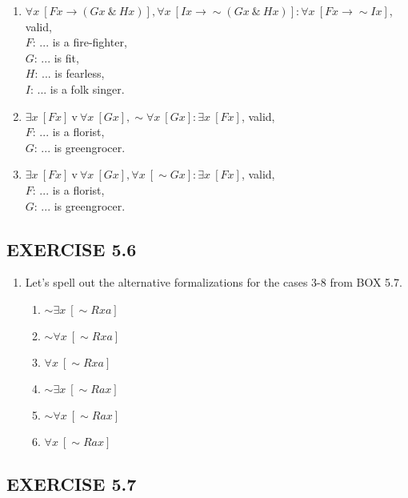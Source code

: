 \documentclass[a4paper,12pt]{article}
\newcommand{\ra}{\rightarrow}
\newcommand{\s}{\sim}
\newcommand{\tv}{ \ \textrm{v} \ }
\newcommand{\ta}{ \ \& \ }
\newcommand{\all}{\forall}
\newcommand{\ex}{\exists}
\begin{document}
\begin{enumerate}[label=\arabic*,leftmargin=*]
\begin{enumerate}[label=(\roman*),leftmargin=*]
                \item $\all x \ [Fx \ra (Gx \ta Hx)], \all x \ [Ix \ra \s (Gx \ta Hx)] : \all x \ [Fx \ra \s Ix]$, valid,\\
                    $F$: ... is a fire-fighter,\\
                    $G$: ... is fit,\\
                    $H$: ... is fearless,\\
                    $I$: ... is a folk singer.
                \item $\ex x \ [Fx] \tv \all x \ [Gx], \s \all x \ [Gx] : \ex x \ [Fx]$, valid,\\
                    $F$: ... is a florist,\\
                    $G$: ... is greengrocer.
                \item $\ex x \ [Fx] \tv \all x \ [Gx], \all x \ [\s Gx] : \ex x \ [Fx]$, valid,\\
                    $F$: ... is a florist,\\
                    $G$: ... is greengrocer.
            \end{enumerate}

    \end{enumerate}

    \subsection*{EXERCISE 5.6}

    \begin{enumerate}[label=\arabic*,leftmargin=*]
        \item Let's spell out the alternative formalizations for the cases 3-8 from BOX 5.7.
            \begin{enumerate}[label=\arabic*,start=3]
                \item $\s \ex x \ [\s Rxa]$
                \item $\s \all x \ [\s Rxa]$
                \item $\all x \ [\s Rxa]$
                \item $\s \ex x \ [\s Rax]$
                \item $\s \all x \ [\s Rax]$
                \item $\all x \ [\s Rax]$
            \end{enumerate}
    \end{enumerate}

    \subsection*{EXERCISE 5.7}
\end{document}
